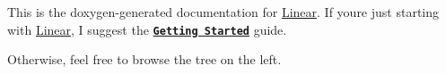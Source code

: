 This is the doxygen-\/generated documentation for \mbox{\hyperlink{namespace_linear}{Linear}}. If you\textquotesingle{}re just starting with \mbox{\hyperlink{namespace_linear}{Linear}}, I suggest the \href{md__getting_started.html}{\texttt{ {\bfseries{Getting Started}}}} guide.

Otherwise, feel free to browse the tree on the left. 